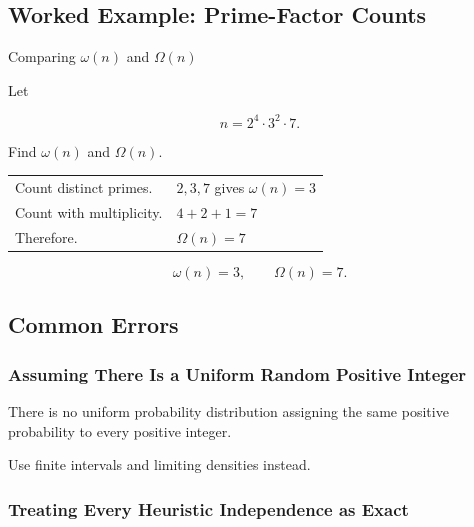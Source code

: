 \subsection{Worked Example: Prime-Factor Counts}
\label{subsec:worked-prime-factor-counts}

\begin{workedexamplebox}{Comparing \(\omega(n)\) and \(\Omega(n)\)}

Let

\[ n=2^4\cdot3^2\cdot7. \]

Find \(\omega(n)\) and \(\Omega(n)\).

\begin{tabularx}{\textwidth}{@{}>{\raggedright\arraybackslash}p{}X@{}}
Count distinct primes. & \(2,3,7\) gives \(\omega(n)=3\)\\
Count with multiplicity. & \(4+2+1=7\)\\
Therefore. & \(\Omega(n)=7\)
\end{tabularx}

\begin{answerbox}
\[ \boxed{\omega(n)=3,\qquad\Omega(n)=7.} \]
\end{answerbox}
\end{workedexamplebox}

\subsection{Common Errors}
\label{subsec:probabilistic-number-theory-common-errors}

\subsubsection{Assuming There Is a Uniform Random Positive Integer}

There is no uniform probability distribution assigning the same positive
probability to every positive integer.

Use finite intervals and limiting densities instead.

\subsubsection{Treating Every Heuristic Independence as Exact}

